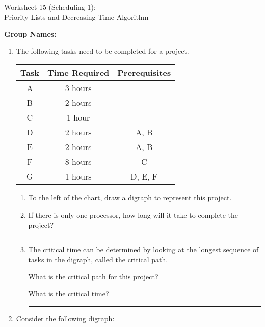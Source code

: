 \documentclass[12pt]{article}
\newcommand{\ans}[1][1in]{\rule{#1}{.5pt}}
\newcommand{\be}{\begin{enumerate}}
\newcommand{\ee}{\end{enumerate}}
\begin{document}
\begin{center}
{\Large  Worksheet 15 (Scheduling 1): \\Priority Lists and Decreasing Time Algorithm}
\end{center}



\noindent \textbf{Group Names:} \hrulefill \\
\begin{enumerate}

\item The following tasks need to be completed for a project.

    \begin{tabular}{|c|c|c|}
      \hline
      {\bf Task} & {\bf Time Required} & {\bf Prerequisites} \\
      \hline
      A & 3 hours &  \\
      \hline
      B & 2 hours & \\
      \hline
      C & 1 hour & \\
      \hline
      D & 2 hours & A, B \\
      \hline
      E & 2 hours & A, B \\
      \hline
      F & 8 hours & C \\
      \hline
      G & 1 hours & D, E, F \\
      \hline
    \end{tabular}
  \be
  \item
 To the left of the chart, draw a digraph to represent this project.
    \item If there is only one processor, how long will it take to complete the project? \ans
    
    \item The critical time can be determined by looking at the longest sequence of tasks in the
digraph, called the critical path. 

What is the critical path for this project? \hrulefill 

What is the critical time? \ans
   
\ee
\item Consider the following digraph:


\end{enumerate}
\end{document}
